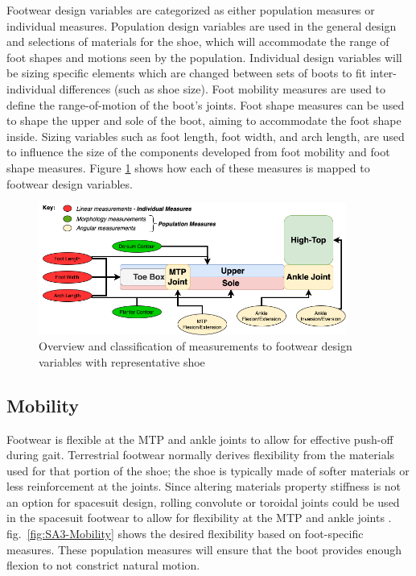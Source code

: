\documentclass[defaultstyle,11pt]{comps}
\begin{document}
Footwear design variables are categorized as either population measures or individual measures.
Population design variables are used in the general design and selections of materials for the shoe, which will accommodate the range of foot shapes and motions seen by the population.
Individual design variables will be sizing specific elements which are changed between sets of boots to fit inter-individual differences (such as shoe size).
Foot mobility measures are used to define the range-of-motion of the boot's joints.
Foot shape measures can be used to shape the upper and sole of the boot, aiming to accommodate the foot shape inside.
Sizing variables such as foot length, foot width, and arch length, are used to influence the size of the components developed from foot mobility and foot shape measures.
Figure \ref{fig:SA3-Overview} shows how each of these measures is mapped to footwear design variables.

\begin{figure}
\hypertarget{fig:SA3-Overview}{%
\centering
\includegraphics[width=0.9\textwidth,height=\textheight]{../fig/SA3/Overview.png}
\caption{Overview and classification of measurements to footwear design variables with representative shoe}\label{fig:SA3-Overview}
}
\end{figure}

\hypertarget{mobility}{%
\subsection{Mobility}\label{mobility}}

Footwear is flexible at the MTP and ankle joints to allow for effective push-off during gait. Terrestrial footwear normally derives flexibility from the materials used for that portion of the shoe; the shoe is typically made of softer materials or less reinforcement at the joints. Since altering materials property stiffness is not an option for spacesuit design, rolling convolute or toroidal joints could be used in the spacesuit footwear to allow for flexibility at the MTP and ankle joints \citep{Harris2001}. fig.~\ref{fig:SA3-Mobility} shows the desired flexibility based on foot-specific measures. These population measures will ensure that the boot provides enough flexion to not constrict natural motion.
\end{document}
